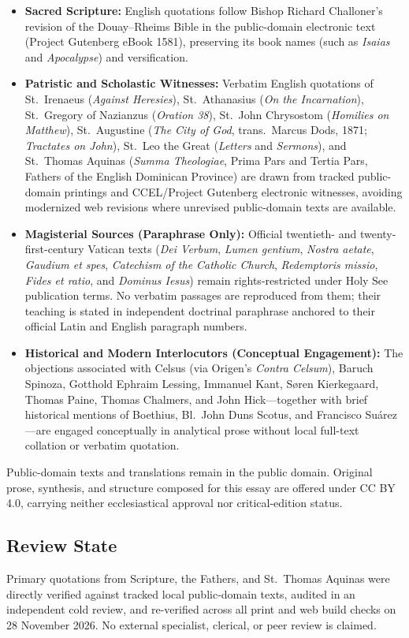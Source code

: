 \begin{itemize}
\item \textbf{Sacred Scripture:} English quotations follow Bishop Richard Challoner's revision of the Douay--Rheims Bible in the public-domain electronic text (Project Gutenberg eBook 1581), preserving its book names (such as \textit{Isaias} and \textit{Apocalypse}) and versification.
\item \textbf{Patristic and Scholastic Witnesses:} Verbatim English quotations of St.\ Irenaeus (\textit{Against Heresies}), St.\ Athanasius (\textit{On the Incarnation}), St.\ Gregory of Nazianzus (\textit{Oration 38}), St.\ John Chrysostom (\textit{Homilies on Matthew}), St.\ Augustine (\textit{The City of God}, trans.\ Marcus Dods, 1871; \textit{Tractates on John}), St.\ Leo the Great (\textit{Letters} and \textit{Sermons}), and St.\ Thomas Aquinas (\textit{Summa Theologiae}, Prima Pars and Tertia Pars, Fathers of the English Dominican Province) are drawn from tracked public-domain printings and CCEL/Project Gutenberg electronic witnesses, avoiding modernized web revisions where unrevised public-domain texts are available.
\item \textbf{Magisterial Sources (Paraphrase Only):} Official twentieth- and twenty-first-century Vatican texts (\textit{Dei Verbum}, \textit{Lumen gentium}, \textit{Nostra aetate}, \textit{Gaudium et spes}, \textit{Catechism of the Catholic Church}, \textit{Redemptoris missio}, \textit{Fides et ratio}, and \textit{Dominus Iesus}) remain rights-restricted under Holy See publication terms. No verbatim passages are reproduced from them; their teaching is stated in independent doctrinal paraphrase anchored to their official Latin and English paragraph numbers.
\item \textbf{Historical and Modern Interlocutors (Conceptual Engagement):} The objections associated with Celsus (via Origen's \textit{Contra Celsum}), Baruch Spinoza, Gotthold Ephraim Lessing, Immanuel Kant, S\o ren Kierkegaard, Thomas Paine, Thomas Chalmers, and John Hick---together with brief historical mentions of Boethius, Bl.\ John Duns Scotus, and Francisco Su\'arez---are engaged conceptually in analytical prose without local full-text collation or verbatim quotation.
\end{itemize}

Public-domain texts and translations remain in the public domain. Original prose, synthesis, and structure composed for this essay are offered under CC BY 4.0, carrying neither ecclesiastical approval nor critical-edition status.

\subsection*{Review State}

Primary quotations from Scripture, the Fathers, and St.\ Thomas Aquinas were directly verified against tracked local public-domain texts, audited in an independent cold review, and re-verified across all print and web build checks on 28 November 2026. No external specialist, clerical, or peer review is claimed.
